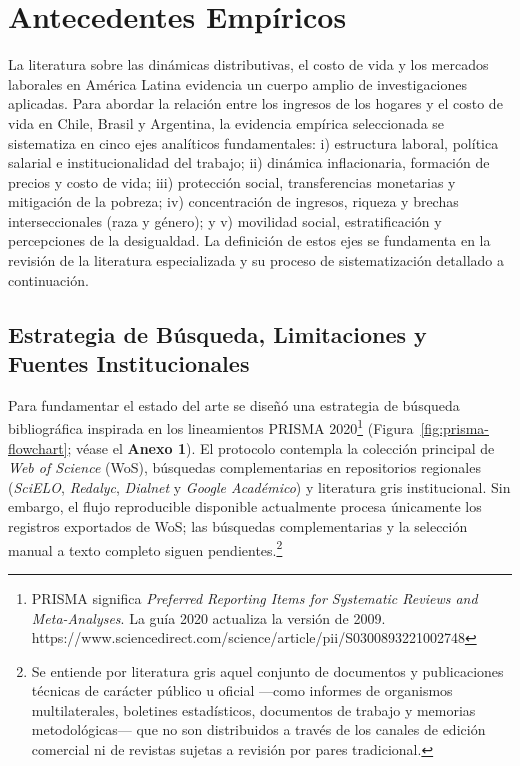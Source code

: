 \section{Antecedentes Empíricos}

La literatura sobre las dinámicas distributivas, el costo de vida y los mercados laborales en América Latina evidencia un cuerpo amplio de investigaciones aplicadas. Para abordar la relación entre los ingresos de los hogares y el costo de vida en Chile, Brasil y Argentina, la evidencia empírica seleccionada se sistematiza en cinco ejes analíticos fundamentales: i) estructura laboral, política salarial e institucionalidad del trabajo; ii) dinámica inflacionaria, formación de precios y costo de vida; iii) protección social, transferencias monetarias y mitigación de la pobreza; iv) concentración de ingresos, riqueza y brechas interseccionales (raza y género); y v) movilidad social, estratificación y percepciones de la desigualdad. La definición de estos ejes se fundamenta en la revisión de la literatura especializada y su proceso de sistematización detallado a continuación.

\subsection{Estrategia de Búsqueda, Limitaciones y Fuentes Institucionales}

Para fundamentar el estado del arte se diseñó una estrategia de búsqueda bibliográfica inspirada en los lineamientos PRISMA 2020\footnote[2]{PRISMA significa \textit{Preferred Reporting Items for Systematic Reviews and Meta-Analyses}. La guía 2020 actualiza la versión de 2009. https://www.sciencedirect.com/science/article/pii/S0300893221002748} (Figura~\ref{fig:prisma-flowchart}; véase el \textbf{Anexo 1}). El protocolo contempla la colección principal de \textit{Web of Science} (WoS), búsquedas complementarias en repositorios regionales (\textit{SciELO}, \textit{Redalyc}, \textit{Dialnet} y \textit{Google Académico}) y literatura gris institucional. Sin embargo, el flujo reproducible disponible actualmente procesa únicamente los registros exportados de WoS; las búsquedas complementarias y la selección manual a texto completo siguen pendientes.\footnote{Se entiende por literatura gris aquel conjunto de documentos y publicaciones técnicas de carácter público u oficial —como informes de organismos multilaterales, boletines estadísticos, documentos de trabajo y memorias metodológicas— que no son distribuidos a través de los canales de edición comercial ni de revistas sujetas a revisión por pares tradicional.}

